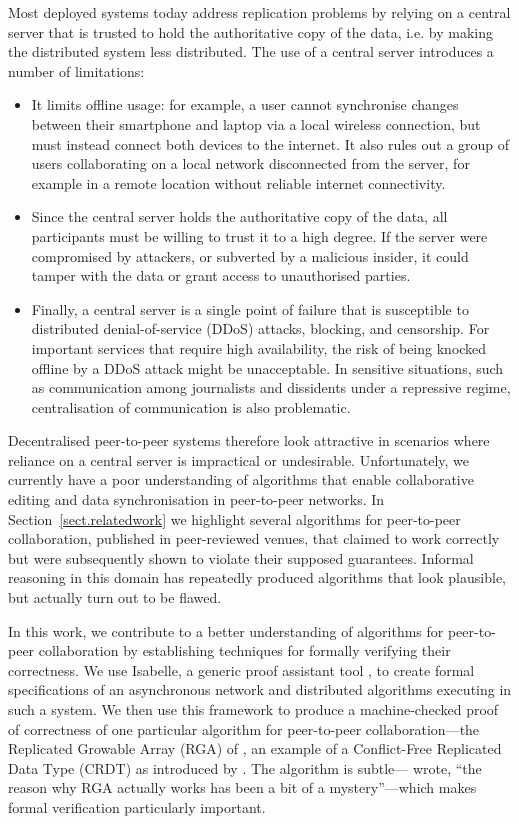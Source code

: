 \documentclass[acmlarge,review,anonymous]{acmart}\settopmatter{printfolios=true}
\begin{document}

Most deployed systems today address replication problems by relying on a central server that is
trusted to hold the authoritative copy of the data, i.e. by making the distributed system less
distributed. The use of a central server introduces a number of limitations:
\begin{itemize}
\item It limits offline usage: for example, a user cannot synchronise changes between their
    smartphone and laptop via a local wireless connection, but must instead connect both devices to
    the internet. It also rules out a group of users collaborating on a local network disconnected
    from the server, for example in a remote location without reliable internet connectivity.
\item Since the central server holds the authoritative copy of the data, all participants must be
    willing to trust it to a high degree. If the server were compromised by attackers, or subverted
    by a malicious insider, it could tamper with the data or grant access to unauthorised parties.
\item Finally, a central server is a single point of failure that is susceptible to distributed
    denial-of-service (DDoS) attacks, blocking, and censorship. For important services that require
    high availability, the risk of being knocked offline by a DDoS attack might be unacceptable. In
    sensitive situations, such as communication among journalists and dissidents under a repressive
    regime, centralisation of communication is also problematic.
\end{itemize}

Decentralised peer-to-peer systems therefore look attractive in scenarios where reliance on a
central server is impractical or undesirable. Unfortunately, we currently have a poor understanding
of algorithms that enable collaborative editing and data synchronisation in peer-to-peer networks.
In Section~\ref{sect.relatedwork} we highlight several algorithms for peer-to-peer collaboration,
published in peer-reviewed venues, that claimed to work correctly but were subsequently shown to violate
their supposed guarantees. Informal reasoning in this domain has repeatedly produced algorithms that
look plausible, but actually turn out to be flawed.

In this work, we contribute to a better understanding of algorithms for peer-to-peer collaboration
by establishing techniques for formally verifying their correctness. We use Isabelle, a generic
proof assistant tool \cite{DBLP:conf/tphol/WenzelPN08}, to create formal specifications of an
asynchronous network and distributed algorithms executing in such a system. We then use this
framework to produce a machine-checked proof of correctness of one particular algorithm for
peer-to-peer collaboration---the Replicated Growable Array (RGA) of \citet{Roh:2011dw}, an example
of a Conflict-Free Replicated Data Type (CRDT) as introduced by
\citet{Shapiro:2011wy,Shapiro:2011un}.
The algorithm is subtle---\citet{Attiya:2016kh} wrote, ``the reason why RGA actually works has been
a bit of a mystery''---which makes formal verification particularly important.
\end{document}
